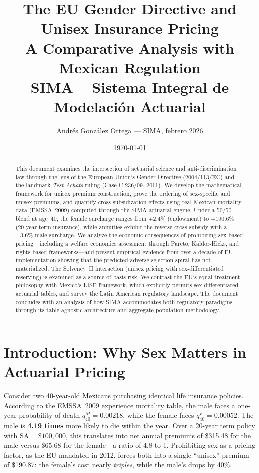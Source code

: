 \documentclass[12pt,a4paper]{article}
\title{\textbf{The EU Gender Directive and} \\ \textbf{Unisex Insurance Pricing} \\[0.5em]
\large A Comparative Analysis with Mexican Regulation \\[0.3em]
\normalsize SIMA -- Sistema Integral de Modelaci\'{o}n Actuarial}
\author{Andr\'{e}s Gonz\'{a}lez Ortega --- SIMA, febrero 2026}
\date{\today}
\newcommand{\qx}[1]{q_{#1}}
\newcommand{\SA}{\text{SA}}
\begin{document}
\maketitle

\begin{abstract}\sloppy
This document examines the intersection of actuarial science and anti-discrimination law
through the lens of the European Union's Gender Directive (2004/113/EC) and the landmark
\emph{Test-Achats} ruling (Case C-236/09, 2011). We develop the mathematical framework
for unisex premium construction, prove the ordering of sex-specific and unisex premiums,
and quantify cross-subsidization effects using real Mexican mortality data (EMSSA~2009)
computed through the SIMA actuarial engine. Under a 50/50 blend at age~40, the female
surcharge ranges from $+2.4\%$ (endowment) to $+190.6\%$ (20-year term insurance),
while annuities exhibit the reverse cross-subsidy with a $+3.6\%$ male surcharge.
We analyze the economic consequences of prohibiting sex-based pricing---including a
welfare economics assessment through Pareto, Kaldor-Hicks, and rights-based frameworks---and
present empirical evidence from over a decade of EU implementation showing that the predicted
adverse selection spiral has not materialized. The Solvency~II interaction (unisex pricing
with sex-differentiated reserving) is examined as a source of basis risk. We contrast the EU's
equal-treatment philosophy with Mexico's LISF framework, which explicitly permits
sex-differentiated actuarial tables, and survey the Latin American regulatory landscape.
The document concludes with an analysis of how SIMA accommodates both regulatory paradigms
through its table-agnostic architecture and aggregate population methodology.
\end{abstract}

\tableofcontents
\newpage

\section{Introduction: Why Sex Matters in Actuarial Pricing}
\label{sec:introduction}

Consider two 40-year-old Mexicans purchasing identical life insurance policies.
According to the EMSSA~2009 experience mortality table, the male faces a
one-year probability of death $\qx{40}^M = 0.00218$, while the female faces
$\qx{40}^F = 0.00052$. The male is \textbf{4.19 times} more likely to die
within the year. Over a 20-year term policy with $\SA = \$100{,}000$, this
translates into net annual premiums of \$315.48 for the male versus \$65.68
for the female---a ratio of 4.8 to 1. Prohibiting sex as a pricing factor, as
the EU mandated in 2012, forces both into a single ``unisex'' premium of
\$190.87: the female's cost nearly \emph{triples}, while the male's drops by
40\%.
\end{document}
